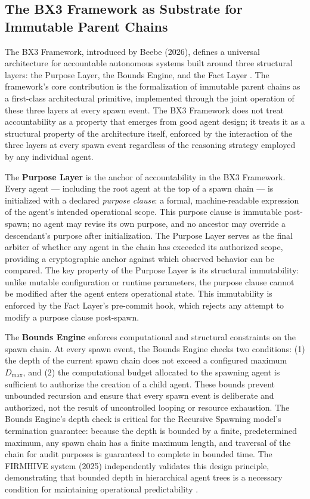 \subsection{The BX3 Framework as Substrate for Immutable Parent Chains}
\label{sec:bx3}

The BX3 Framework, introduced by Beebe (2026), defines a universal architecture for accountable autonomous systems built around three structural layers: the Purpose Layer, the Bounds Engine, and the Fact Layer \cite{bx3framework2026}. The framework's core contribution is the formalization of immutable parent chains as a first-class architectural primitive, implemented through the joint operation of these three layers at every spawn event. The BX3 Framework does not treat accountability as a property that emerges from good agent design; it treats it as a structural property of the architecture itself, enforced by the interaction of the three layers at every spawn event regardless of the reasoning strategy employed by any individual agent.

The \textbf{Purpose Layer} is the anchor of accountability in the BX3 Framework. Every agent — including the root agent at the top of a spawn chain — is initialized with a declared \textit{purpose clause}: a formal, machine-readable expression of the agent's intended operational scope. This purpose clause is immutable post-spawn; no agent may revise its own purpose, and no ancestor may override a descendant's purpose after initialization. The Purpose Layer serves as the final arbiter of whether any agent in the chain has exceeded its authorized scope, providing a cryptographic anchor against which observed behavior can be compared. The key property of the Purpose Layer is its structural immutability: unlike mutable configuration or runtime parameters, the purpose clause cannot be modified after the agent enters operational state. This immutability is enforced by the Fact Layer's pre-commit hook, which rejects any attempt to modify a purpose clause post-spawn.

The \textbf{Bounds Engine} enforces computational and structural constraints on the spawn chain. At every spawn event, the Bounds Engine checks two conditions: (1) the depth of the current spawn chain does not exceed a configured maximum $D_{\max}$, and (2) the computational budget allocated to the spawning agent is sufficient to authorize the creation of a child agent. These bounds prevent unbounded recursion and ensure that every spawn event is deliberate and authorized, not the result of uncontrolled looping or resource exhaustion. The Bounds Engine's depth check is critical for the Recursive Spawning model's termination guarantee: because the depth is bounded by a finite, predetermined maximum, any spawn chain has a finite maximum length, and traversal of the chain for audit purposes is guaranteed to complete in bounded time. The FIRMHIVE system (2025) independently validates this design principle, demonstrating that bounded depth in hierarchical agent trees is a necessary condition for maintaining operational predictability \cite{firmhive2025}.

